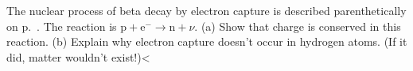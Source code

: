 The nuclear process of beta decay by electron capture
is described parenthetically on p.~\pageref{electroncapture}. The reaction is
$\text{p}+\text{e}^- \rightarrow  \text{n}+\nu $. (a) Show that charge is conserved in this
reaction.\hwendpart
 (b) Explain why electron capture doesn't occur in
hydrogen atoms. (If it did, matter wouldn't exist!)<%

